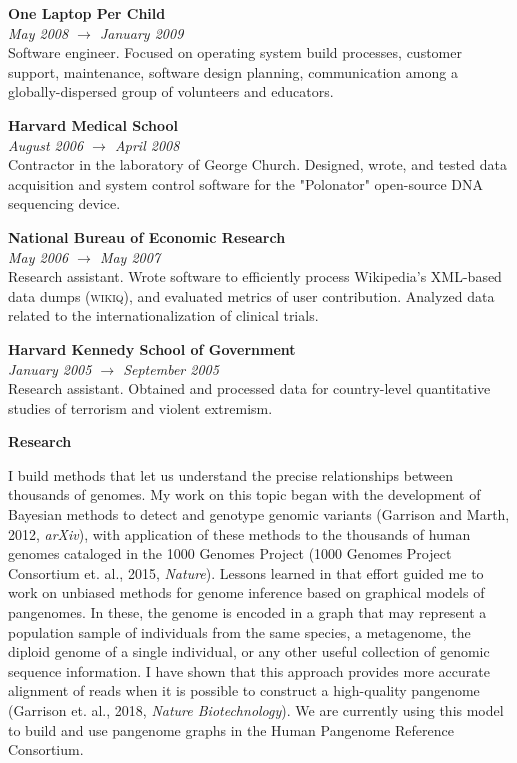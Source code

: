 \documentclass[11pt,hidelinks,letterpaper]{article}
\begin{document}
\hfill \break
\noindent
{\large \bf One Laptop Per Child} \\
\emph{May 2008 $\to$ January 2009} \\
Software engineer. Focused on operating system build processes, customer support, maintenance, software design planning, communication among a globally-dispersed group of volunteers and educators.

\hfill \break
\noindent
{\large \bf Harvard Medical School} \\
\emph{August 2006 $\to$ April 2008} \\
Contractor in the laboratory of George Church. Designed, wrote, and tested data acquisition and system control software for the "Polonator" open-source DNA sequencing device.

\hfill \break
\noindent
{\large \bf National Bureau of Economic Research} \\
\emph{May 2006 $\to$ May 2007} \\
Research assistant. Wrote software to efficiently process Wikipedia's XML-based data dumps (\textsc{wikiq}), and evaluated metrics of user contribution. Analyzed data related to the internationalization of clinical trials.

\hfill \break
\noindent
{\large \bf Harvard Kennedy School of Government} \\
\emph{January 2005 $\to$ September 2005} \\
Research assistant. Obtained and processed data for country-level quantitative studies of terrorism and violent extremism.

\hfill \break
\hfill \break
\noindent
{\LARGE \bf Research}
\hfill \break

\noindent
I build methods that let us understand the precise relationships between thousands of genomes.
My work on this topic began with the development of Bayesian methods to detect and genotype genomic variants (Garrison and Marth, 2012, \textit{arXiv}), with application of these methods to the thousands of human genomes cataloged in the 1000 Genomes Project (1000 Genomes Project Consortium et. al., 2015, \textit{Nature}).
Lessons learned in that effort guided me to work on unbiased methods for genome inference based on graphical models of pangenomes.
In these, the genome is encoded in a graph that may represent a population sample of individuals from the same species, a metagenome, the diploid genome of a single individual, or any other useful collection of genomic sequence information.
I have shown that this approach provides more accurate alignment of reads when it is possible to construct a high-quality pangenome (Garrison et. al., 2018, \textit{Nature Biotechnology}).
We are currently using this model to build and use pangenome graphs in the Human Pangenome Reference Consortium.
\end{document}
